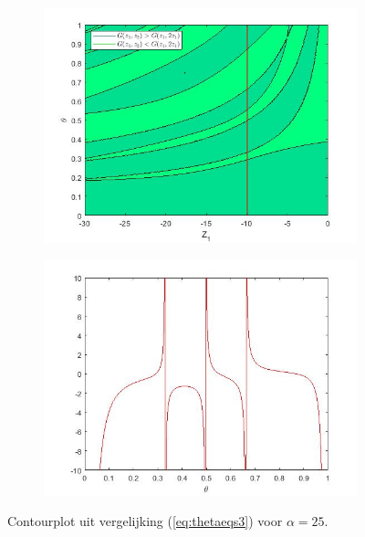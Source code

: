 \documentclass[12pt]{article}
\begin{document}
\begin{figure}[H]
    \begin{subfigure}{0.49\textwidth}
    \includegraphics[width=0.9\linewidth]{contours3alpha5.jpg} 
    \end{subfigure}
    \begin{subfigure}{0.49\textwidth}
    \includegraphics[width=0.9\linewidth]{contours3alpha5_ex.jpg}
    \end{subfigure}
    \caption{Contourplot uit vergelijking (\ref{eq:thetaeqs3}) voor \(\alpha=25\).}
    \label{fig:implicits3_2}
\end{figure}
\end{document}
